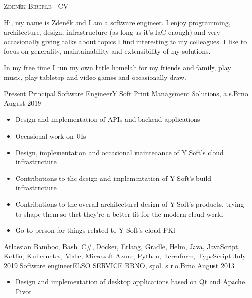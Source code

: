 \documentclass[localFont,alternative]{yaac-another-awesome-cv}
\newcommand{\dumblang}[2]{{#2}}
\begin{document}
	\makecvheader

	\makecvfooter
		{\textsc{}}
		{\textsc{Zdeněk Biberle - CV}}
		{\thepage}

	Hi, my name is Zdeněk and I am a software engineer. I enjoy programming, architecture, design, infrastructure (as long as it's IaC enough) and very occasionally giving talks about topics I find interesting to my colleagues. I like to focus on generality, maintainability and extensibility of my solutions.

	In my free time I run my own little homelab for my friends and family, play music, play tabletop and video games and occasionally draw.

	\sectionTitle{\dumblang{Pracovní zkušenosti}{Experience}}{\faSuitcase}
	\begin{experiences}
		\experience
			{\dumblang{Současnost}{Present}}
			{Principal Software Engineer}{Y Soft Print Management Solutions, a.s.}{Brno}
			{\dumblang{Srpen 2019}{August 2019}}
			{
				\begin{itemize}
					\item \dumblang{Vývoj a návrh API a backendových aplikací}{Design and implementation of APIs and backend applications}
					\item \dumblang{UI}{Occasional work on UIs}
					\item \dumblang{Vývoj, návrh a občasná údržba cloudové infrastruktury}{Design, implementation and occasional maintenance of Y Soft's cloud infrastructure}
					\item \dumblang{Vývoj, návrh a údržba build infrastruktury}{Contributions to the design and implementation of Y Soft's build infrastructure}
					\item \dumblang{Architektura}{Contributions to the overall architectural design of Y Soft's products, trying to shape them so that they're a better fit for the modern cloud world}
					\item \dumblang{PKI}{Go-to-person for things related to Y Soft's cloud PKI}
				\end{itemize}
			}
			{Atlassian Bamboo, Bash, C\#, Docker, Erlang, Gradle, Helm, Java, JavaScript, Kotlin, Kubernetes, Make, Microsoft Azure, Python, Terraform, TypeScript}
		\emptySeparator
		\experience
			{\dumblang{Červenec 2019}{July 2019}}
			{\dumblang{Softwarový vývojář}{Software engineer}}{ELSO SERVICE BRNO, spol. s r.o.}{Brno}
			{\dumblang{Srpen 2013}{August 2013}}
			{
				\begin{itemize}
				\item \dumblang{Vývoj a návrh desktopových aplikací na bázi Qt a Apache Pivot}{Design and implementation of desktop applications based on Qt and Apache Pivot}

\end{itemize}}
\end{experiences}
\end{document}
